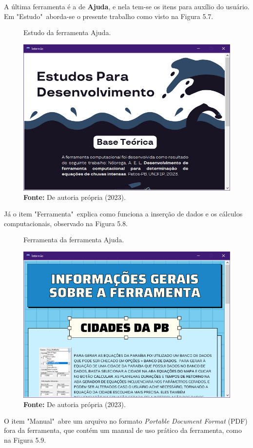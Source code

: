 A última ferramenta é a de \textbf{Ajuda}, e nela tem-se os itens para auxílio do usuário. Em "Estudo"\ aborda-se o presente trabalho como visto na Figura 5.7.

\begin{figure}[!ht]
	\centering
	\caption{Estudo da ferramenta Ajuda.}
	\includegraphics[width=.7625\linewidth]{figuras/estudo.png}
	\caption*{\textbf{Fonte:} De autoria própria (2023).}
	\label{fig:figuras/estudo.png}
\end{figure}

Já o item "Ferramenta"\ explica como funciona a inserção de dados e os cálculos computacionais, observado na Figura 5.8.

\begin{figure}[!ht]
	\centering
	\caption{Ferramenta da ferramenta Ajuda.}
	\includegraphics[width=.7625\linewidth]{figuras/ferramenta.png}
	\caption*{\textbf{Fonte:} De autoria própria (2023).}
	\label{fig:figuras/ferramenta.png}
\end{figure}

\newpage

O item "Manual"\ abre um arquivo no formato \textit{Portable Document Format} (PDF) fora da ferramenta, que contém um manual de uso prático da ferramenta, como na Figura 5.9.

